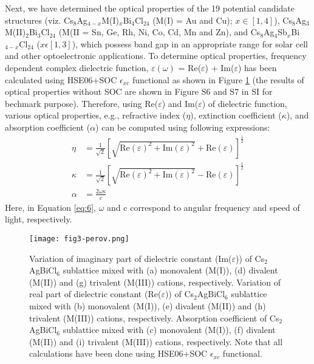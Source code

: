 \documentclass[journal=jpclcd,manuscript=letter]{achemso}
\begin{document}
Next, we have determined the optical properties of the 19 potential candidate structures (viz. Cs$_8$Ag$_{4-x}$M(I)$_x$Bi$_4$Cl$_{24}$ (M(I) = Au and Cu); $x\in[1,4]$), Cs$_8$Ag$_3$M(II)$_2$Bi$_3$Cl$_{24}$ (M(II = Sn, Ge, Rh, Ni, Co, Cd, Mn and Zn), and Cs$_8$Ag$_{4}$Sb$_x$Bi$_{4-x}$Cl$_{24}$ ($x\epsilon[1,3]$), which possess band gap in an appropriate range for solar cell and other optoelectronic applications.
To determine optical properties, frequency dependent complex dielectric function, $\varepsilon(\omega)$ = Re($\varepsilon$) + Im($\varepsilon$) has been calculated using HSE06+SOC $\epsilon_{xc}$ functional as shown in Figure \ref{fig3} (the results of optical properties without SOC are shown in Figure S6 and S7 in SI for bechmark purpose).
Therefore, using Re($\varepsilon$) and Im($\varepsilon$) of dielectric function, various optical properties, e.g., refractive index ($\eta$), extinction coefficient ($\kappa$), and absorption coefficient ($\alpha$) can be computed using following expressions:
\begin{align}
\eta&= \frac{1}{\sqrt{2}}\left[\sqrt{\textrm{Re}(\varepsilon)^2 + \textrm{Im}(\varepsilon)^2} + \textrm{Re}(\varepsilon)\right]^{\frac{1}{2}}
\label{eq:4}\\
\kappa&= \frac{1}{\sqrt{2}}\left[\sqrt{\textrm{Re}(\varepsilon)^2 + \textrm{Im}(\varepsilon)^2} - \textrm{Re}(\varepsilon)\right]^{\frac{1}{2}}
\label{eq:5}\\
\alpha &= \frac{2\omega\kappa}{c} 
\label{eq:6}
\end{align}
Here, in Equation \ref{eq:6}, $\omega$ and c correspond to angular frequency and speed of light, respectively.
\begin{figure}
	\texttt{[image: fig3-perov.png]}
	\caption{Variation of imaginary part of dielectric constant (Im($\varepsilon$)) of Cs$_2$AgBiCl$_6$ sublattice mixed with (a) monovalent (M(I)), (d) divalent (M(II)) and (g) trivalent (M(III)) cations, respectively. Variation of real part of dielectric constant (Re($\varepsilon$)) of Cs$_2$AgBiCl$_6$ sublattice mixed with (b) monovalent (M(I)), (e) divalent (M(II)) and (h) trivalent (M(III)) cations, respectively. Absorption coefficient of Cs$_2$AgBiCl$_6$ sublattice mixed with (c)  monovalent (M(I)), (f) divalent (M(II)) and (i) trivalent (M(III)) cations, respectively. Note that all calculations have been done using HSE06+SOC $\epsilon_{xc}$ functional.}
	\label{fig3} 
\end{figure} 
\end{document}
